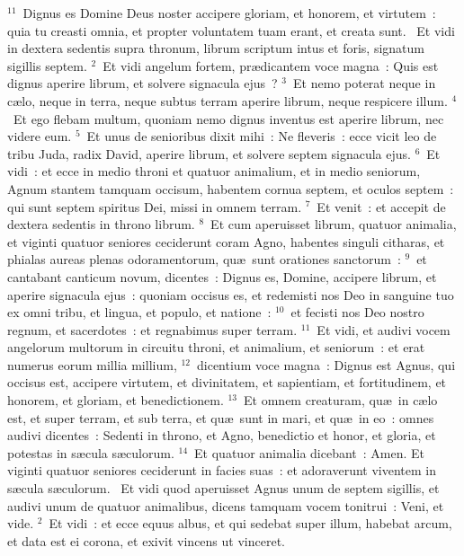 ${}^{11}$~Dignus es Domine Deus noster accipere gloriam, et honorem, et virtutem~: quia tu creasti omnia, et propter voluntatem tuam erant, et creata sunt.
~Et vidi in dextera sedentis supra thronum, librum scriptum intus et foris, signatum sigillis septem.
${}^{2}$~Et vidi angelum fortem, pr\ae dicantem voce magna~: Quis est dignus aperire librum, et solvere signacula ejus~?
${}^{3}$~Et nemo poterat neque in c\ae lo, neque in terra, neque subtus terram aperire librum, neque respicere illum.
${}^{4}$~Et ego flebam multum, quoniam nemo dignus inventus est aperire librum, nec videre eum.
${}^{5}$~Et unus de senioribus dixit mihi~: Ne fleveris~: ecce vicit leo de tribu Juda, radix David, aperire librum, et solvere septem signacula ejus.
${}^{6}$~Et vidi~: et ecce in medio throni et quatuor animalium, et in medio seniorum, Agnum stantem tamquam occisum, habentem cornua septem, et oculos septem~: qui sunt septem spiritus Dei, missi in omnem terram.
${}^{7}$~Et venit~: et accepit de dextera sedentis in throno librum.
${}^{8}$~Et cum aperuisset librum, quatuor animalia, et viginti quatuor seniores ceciderunt coram Agno, habentes singuli citharas, et phialas aureas plenas odoramentorum, qu\ae\ sunt orationes sanctorum~:
${}^{9}$~et cantabant canticum novum, dicentes~: Dignus es, Domine, accipere librum, et aperire signacula ejus~: quoniam occisus es, et redemisti nos Deo in sanguine tuo ex omni tribu, et lingua, et populo, et natione~:
${}^{10}$~et fecisti nos Deo nostro regnum, et sacerdotes~: et regnabimus super terram.
${}^{11}$~Et vidi, et audivi vocem angelorum multorum in circuitu throni, et animalium, et seniorum~: et erat numerus eorum millia millium,
${}^{12}$~dicentium voce magna~: Dignus est Agnus, qui occisus est, accipere virtutem, et divinitatem, et sapientiam, et fortitudinem, et honorem, et gloriam, et benedictionem.
${}^{13}$~Et omnem creaturam, qu\ae\ in c\ae lo est, et super terram, et sub terra, et qu\ae\ sunt in mari, et qu\ae\ in eo~: omnes audivi dicentes~: Sedenti in throno, et Agno, benedictio et honor, et gloria, et potestas in s\ae cula s\ae culorum.
${}^{14}$~Et quatuor animalia dicebant~: Amen. Et viginti quatuor seniores ceciderunt in facies suas~: et adoraverunt viventem in s\ae cula s\ae culorum.
~Et vidi quod aperuisset Agnus unum de septem sigillis, et audivi unum de quatuor animalibus, dicens tamquam vocem tonitrui~: Veni, et vide.
${}^{2}$~Et vidi~: et ecce equus albus, et qui sedebat super illum, habebat arcum, et data est ei corona, et exivit vincens ut vinceret.
